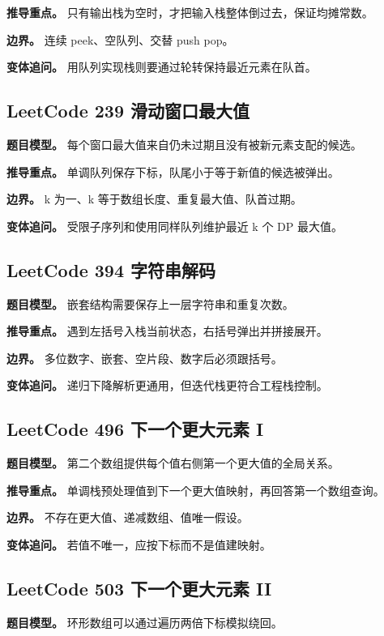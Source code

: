 \textbf{推导重点。} 只有输出栈为空时，才把输入栈整体倒过去，保证均摊常数。

\textbf{边界。} 连续 peek、空队列、交替 push pop。

\textbf{变体追问。} 用队列实现栈则要通过轮转保持最近元素在队首。

\subsection{LeetCode 239 滑动窗口最大值}

\textbf{题目模型。} 每个窗口最大值来自仍未过期且没有被新元素支配的候选。

\textbf{推导重点。} 单调队列保存下标，队尾小于等于新值的候选被弹出。

\textbf{边界。} k 为一、k 等于数组长度、重复最大值、队首过期。

\textbf{变体追问。} 受限子序列和使用同样队列维护最近 k 个 DP 最大值。

\subsection{LeetCode 394 字符串解码}

\textbf{题目模型。} 嵌套结构需要保存上一层字符串和重复次数。

\textbf{推导重点。} 遇到左括号入栈当前状态，右括号弹出并拼接展开。

\textbf{边界。} 多位数字、嵌套、空片段、数字后必须跟括号。

\textbf{变体追问。} 递归下降解析更通用，但迭代栈更符合工程栈控制。

\subsection{LeetCode 496 下一个更大元素 I}

\textbf{题目模型。} 第二个数组提供每个值右侧第一个更大值的全局关系。

\textbf{推导重点。} 单调栈预处理值到下一个更大值映射，再回答第一个数组查询。

\textbf{边界。} 不存在更大值、递减数组、值唯一假设。

\textbf{变体追问。} 若值不唯一，应按下标而不是值建映射。

\subsection{LeetCode 503 下一个更大元素 II}

\textbf{题目模型。} 环形数组可以通过遍历两倍下标模拟绕回。

